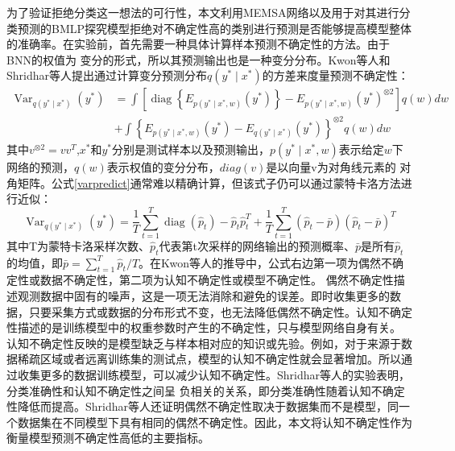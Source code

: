 为了验证拒绝分类这一想法的可行性，本文利用MEMSA网络以及用于对其进行分类预测的BMLP探究模型拒绝对不确定性高的类别进行预测是否能够提高模型整体的准确率。在实验前，首先需要一种具体计算样本预测不确定性的方法。由于BNN的权值为
变分的形式，所以其预测输出也是一种变分分布。Kwon等人\cite{kwon2020uncertainty}和Shridhar等人\cite{shridhar2018uncertainty}提出通过计算变分预测分布$q\left(y^* \mid x^*\right)$的方差来度量预测不确定性：
\begin{equation}
	\label{varpredict}
	\begin{aligned}
	\operatorname{Var}_{q\left(y^* \mid x^*\right)}\left(y^*\right) & =\int\left[\operatorname{diag}\left\{E_{p\left(y^* \mid x^*, w\right)}\left(y^*\right)\right\}-E_{p\left(y^* \mid x^*, w\right)}\left(y^*\right)^{\otimes 2}\right] q(w) d w \\
	& +\int\left\{E_{p\left(y^* \mid x^*, w\right)}\left(y^*\right)-E_{q\left(y^* \mid x^*\right)}\left(y^*\right)\right\}^{\otimes 2} q(w) d w
	\end{aligned}
\end{equation}
其中$v^{\otimes 2} = vv^{T}$,$x^{*}$和$y^{*}$分别是测试样本以及预测输出，$p\left(y^* \mid x^*, w\right)$表示给定$w$下网络的预测，$q(w)$表示权值的变分分布，$diag(v)$是以向量v为对角线元素的
对角矩阵。公式\eqref{varpredict}通常难以精确计算，但该式子仍可以通过蒙特卡洛方法进行近似\cite{kwon2020uncertainty}：
\begin{equation}
	\label{}
	\operatorname{Var}_{q\left(y^* \mid x^*\right)}\left(y^*\right)=\frac{1}{T} \sum_{t=1}^T \operatorname{diag}\left(\hat{p}_t\right)-\hat{p}_t \hat{p}_t^T+\frac{1}{T} \sum_{t=1}^T\left(\hat{p}_t-\bar{p}\right)\left(\hat{p}_t-\bar{p}\right)^T
\end{equation}
其中T为蒙特卡洛采样次数、$\hat{p}_t$代表第t次采样的网络输出的预测概率、$\bar{p}$是所有$\hat{p}_t$的均值，即$\bar{p}=\sum_{t=1}^T \hat{p}_t / T$。在Kwon等人\cite{kwon2020uncertainty}的推导中，公式右边第一项为偶然不确定性或数据不确定性，第二项为认知不确定性或模型不确定性。
偶然不确定性描述观测数据中固有的噪声，这是一项无法消除和避免的误差。即时收集更多的数据，只要采集方式或数据的分布形式不变，也无法降低偶然不确定性。认知不确定性描述的是训练模型中的权重参数时产生的不确定性，只与模型网络自身有关。
认知不确定性反映的是模型缺乏与样本相对应的知识或先验。例如，对于来源于数据稀疏区域或者远离训练集的测试点，模型的认知不确定性就会显著增加\cite{kendall2017uncertainties}。所以通过收集更多的数据训练模型，可以减少认知不确定性。Shridhar等人\cite{shridhar2018uncertainty}的实验表明，分类准确性和认知不确定性之间呈
负相关的关系，即分类准确性随着认知不确定性降低而提高。Shridhar等人\cite{shridhar2018uncertainty}还证明偶然不确定性取决于数据集而不是模型，同一个数据集在不同模型下具有相同的偶然不确定性。因此，本文将认知不确定性作为衡量模型预测不确定性高低的主要指标。

